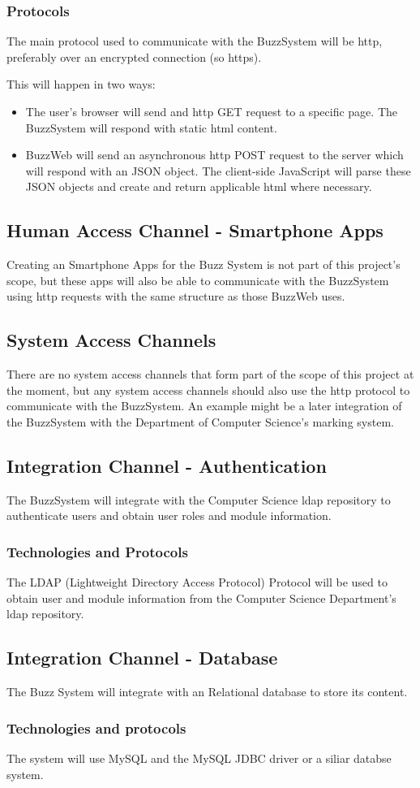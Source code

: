 		
	\subsubsection{Protocols}
	The main protocol used to communicate with the BuzzSystem will be http, preferably over an encrypted connection (so https). 
	
	This will happen in two ways: 
	\begin{itemize}
	\item The user's browser will send and http GET request to a specific page. The BuzzSystem will respond with static html content.
	\item BuzzWeb will send an asynchronous http POST request to the server which will respond with an JSON object. The client-side JavaScript will parse these JSON objects and create and return applicable html where necessary.
	\end{itemize}

\subsection{Human Access Channel - Smartphone Apps}
Creating an Smartphone Apps for the Buzz System is not part of this project's scope, but these apps will also be able to communicate with the BuzzSystem using http requests with the same structure as those BuzzWeb uses.

\subsection{System Access Channels}
There are no system access channels that form part of the scope of this project at the moment, but any system access channels should also use the http protocol to communicate with the BuzzSystem. An example might be a later integration of the BuzzSystem with the Department of Computer Science's marking system.

\subsection{Integration Channel - Authentication}
The BuzzSystem will integrate with the Computer Science ldap repository to authenticate users and obtain user roles and module information. 

\subsubsection{Technologies and Protocols}
The LDAP (Lightweight Directory Access Protocol) Protocol will be used to obtain user and module information from the Computer Science Department's ldap repository. 

\subsection{Integration Channel - Database}
The Buzz System will integrate with an Relational database to store its content. 

\subsubsection{Technologies and protocols}
The system will use MySQL and  the MySQL JDBC driver or a siliar databse system.
